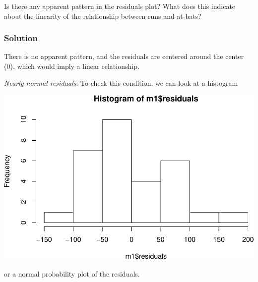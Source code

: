 \documentclass[]{article}
\newenvironment{Shaded}{\begin{snugshade}}{\end{snugshade}}
\newcommand{\KeywordTok}[1]{\textcolor[rgb]{0.13,0.29,0.53}{\textbf{#1}}}
\newcommand{\CommentTok}[1]{\textcolor[rgb]{0.56,0.35,0.01}{\textit{#1}}}
\newcommand{\OperatorTok}[1]{\textcolor[rgb]{0.81,0.36,0.00}{\textbf{#1}}}
\newcommand{\NormalTok}[1]{#1}
\begin{document}
Is there any apparent pattern in the residuals plot? What does this
indicate about the linearity of the relationship between runs and
at-bats?

\subsubsection{Solution}\label{solution-5}

There is no apparent pattern, and the residuals are centered around the
center (0), which would imply a linear relationship.

\emph{Nearly normal residuals}: To check this condition, we can look at
a histogram

\begin{Shaded}
\end{Shaded}

\includegraphics{DATA_606_Lab_7_files/figure-latex/hist-res-1.pdf}

or a normal probability plot of the residuals.

\begin{Shaded}
\end{Shaded}
\end{document}
